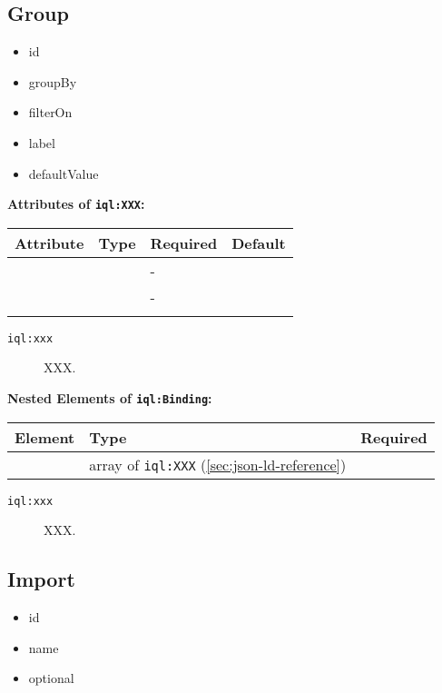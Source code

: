 \documentclass[11pt]{article}
\newcommand{\iqlns}{iql:}
\newcommand{\iqlType}[1]{\texttt{\iqlns#1}}
\newcommand{\attributes}[1]{\noindent\textbf{Attributes of \iqlType{#1}:}\newline\medskip}
\newcommand{\elements}[1]{\noindent\textbf{Nested Elements of \iqlType{#1}:}\newline\medskip}
\begin{document}
\subsection{Group}
\label{sec:json-ld-group}
\begin{itemize}
\item id
\item groupBy
\item filterOn
\item label
\item defaultValue
\end{itemize}
\attributes{XXX}
\begin{tabular}{|p{}|p{}|p{}|p{}|}
	\hline
	\textbf{Attribute} & \textbf{Type} & \textbf{Required} & \textbf{Default} \\ 
	\hline
	\hline
	&  & - &  \\ 
	\hline 
	&  & - &  \\ 
	\hline 
	&  &  & \\ 
	\hline 
\end{tabular}
\begin{description}
	\item[\iqlType{xxx}] XXX.
\end{description}
\elements{Binding}
\begin{tabular}{|p{}|p{}|p{}|}
	\hline
	\textbf{Element} & \textbf{Type} & \textbf{Required} \\ 
	\hline
	\hline 
	& array of \iqlType{XXX} (\ref{sec:json-ld-reference}) &  \\ 
	\hline 
\end{tabular}
\begin{description}
	\item[\iqlType{xxx}] XXX.
\end{description}

\subsection{Import}
\label{sec:json-ld-import}
\begin{itemize}
\item id
\item name
\item optional
\end{itemize}
\end{document}

